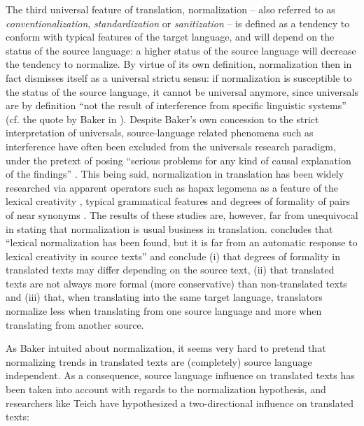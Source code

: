 The third universal feature of translation, normalization – also referred to as \textit{conventionalization}, \textit{standardization} or \textit{sanitization} \citep[23]{zanettin_corpus_2013} – is defined as a tendency to conform with typical features of the target language, and will depend on the status of the source language: a higher status of the source language will decrease the tendency to normalize. By virtue of its own definition, normalization then in fact dismisses itself as a universal strictu sensu: if normalization is susceptible to the status of the source language, it cannot be universal anymore, since universals are by definition “not the result of interference from specific linguistic systems” (cf. the quote by Baker in ). Despite Baker’s own concession to the strict interpretation of universals, source-language related phenomena such as interference have often been excluded from the universals research paradigm, under the pretext of posing “serious problems for any kind of causal explanation of the findings” \citep[311]{pym_tourys_2008}. This being said, normalization in translation has been widely researched via apparent operators such as hapax legomena as a feature of the lexical creativity \citep{kenny_lexis_2001}, typical grammatical features \citep{kranich_between_2011} and degrees of formality of pairs of near synonyms  \citep{oakes_lexical_2012}. The results of these studies are, however, far from unequivocal in stating that normalization is usual business in translation. \citet[210]{kenny_lexis_2001} concludes that “lexical normalization has been found, but it is far from an automatic response to lexical creativity in source texts” and \citet[338]{oakes_lexical_2012} conclude (i) that degrees of formality in translated texts may differ depending on the source text, (ii) that translated texts are not always more formal (more conservative) than non-translated texts and (iii) that, when translating into the same target language, translators normalize less when translating from one source language and more when translating from another source.

As Baker intuited about normalization, it seems very hard to pretend that normalizing trends in translated texts are (completely) source language independent. As a consequence, source language influence on translated texts has been taken into account with regards to the normalization hypothesis, and researchers like Teich have hypothesized a two-directional influence on translated texts:

